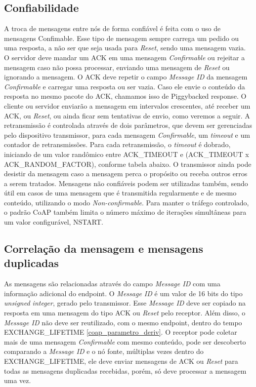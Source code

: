 \subsection{Confiabilidade}

A troca de mensagens entre nós de forma confiável é feita com o uso de mensagens Confimable. Esse tipo de mensagem sempre carrega um pedido ou uma resposta, a não ser que seja usada para \textit{Reset}, sendo uma mensagem vazia.
O servidor deve mandar um ACK em uma mensagem \textit{Confirmable} ou rejeitar a mensagem caso não possa processar, enviando uma mensagem de \textit{Reset} ou ignorando a mensagem. O ACK deve repetir o campo \textit{Message ID} da mensagem \textit{Confirmable} e carregar uma resposta ou ser vazia.  Caso ele envie o conteúdo da resposta no mesmo pacote do ACK, chamamos isso de Piggybacked response.
O cliente ou servidor enviarão a mensagem em intervalos crescentes, até receber um ACK, ou \textit{Reset}, ou ainda ficar sem tentativas de envio, como veremos a seguir.
A retransmissão é controlada através de dois parâmetros, que devem ser gerenciadas pelo dispositivo transmissor, para cada mensagem \textit{Confirmable}, um \textit{timeout} e um contador de retransmissões. Para cada retransmissão, o \textit{timeout} é dobrado, iniciando de um valor randômico entre ACK\_TIMEOUT e (ACK\_TIMEOUT x ACK\_RANDOM\_FACTOR), conforme tabela abaixo. O transmissor ainda pode desistir da mensagem caso a mensagem perca o propósito ou receba outros erros a serem tratados.
Mensagens não confiáveis podem ser utilizadas também, sendo útil em casos de uma mensagem que é transmitida regularmente e de mesmo conteúdo, utilizando o modo \textit{\textit{Non-confirmable}}.
Para manter o tráfego controlado, o padrão CoAP também limita o número máximo de iterações simultâneas para um valor configurável, NSTART.


\subsection{Correlação da mensagem e mensagens duplicadas}

As mensagens são relacionadas através do campo \textit{Message ID} com uma informação adicional do endpoint. O \textit{Message ID} é um valor de 16 bits do tipo \textit{unsigned integer}, gerado pelo transmissor. Esse \textit{Message ID} deve ser copiado na resposta em uma mensagem do tipo ACK ou \textit{Reset} pelo receptor. Além disso, o \textit{Message ID} não deve ser reutilizado, com o mesmo endpoint, dentro do tempo EXCHANGE\_LIFETIME \ref{coap_parametro_deriv}.
O receptor pode coletar mais de uma mensagem \textit{Confirmable} com mesmo conteúdo, pode ser descoberto comparando a \textit{Message ID} e o nó fonte, múltiplas vezes dentro do EXCHANGE\_LIFETIME, ele deve enviar mensagens de ACK ou \textit{Reset} para todas as mensagens duplicadas recebidas, porém, só deve processar a mensagem uma vez.


